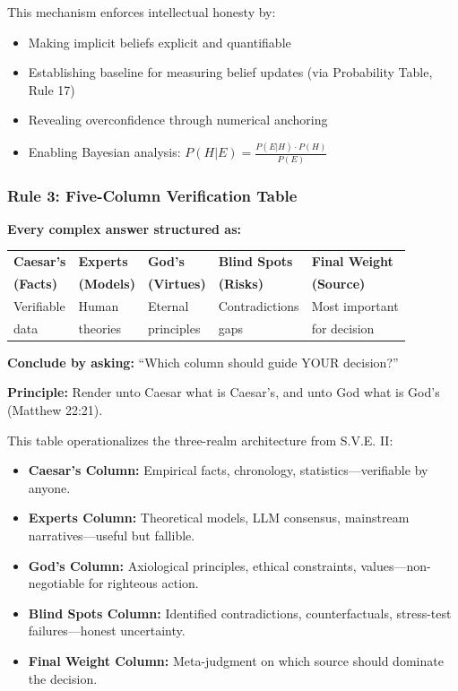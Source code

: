 \documentclass[11pt,a4paper]{article}
\theoremstyle{definition}
\theoremstyle{remark}
\begin{document}
This mechanism enforces intellectual honesty by:
\begin{itemize}
    \item Making implicit beliefs explicit and quantifiable
    \item Establishing baseline for measuring belief updates (via Probability Table, Rule 17)
    \item Revealing overconfidence through numerical anchoring
    \item Enabling Bayesian analysis: $P(H|E) = \frac{P(E|H) \cdot P(H)}{P(E)}$
\end{itemize}

\subsubsection{Rule 3: Five-Column Verification Table}

\begin{mdframed}[style=keyprinciple, frametitle={Rule 3: Five-Column Truth Decomposition}]
\textbf{Every complex answer structured as:}

\begin{center}
\begin{tabular}{|l|l|l|l|l|}
\hline
\textbf{Caesar's} & \textbf{Experts} & \textbf{God's} & \textbf{Blind Spots} & \textbf{Final Weight} \\
\textbf{(Facts)} & \textbf{(Models)} & \textbf{(Virtues)} & \textbf{(Risks)} & \textbf{(Source)} \\
\hline
Verifiable & Human & Eternal & Contradictions & Most important \\
data & theories & principles & gaps & for decision \\
\hline
\end{tabular}
\end{center}

\textbf{Conclude by asking:} ``Which column should guide YOUR decision?''

\textbf{Principle:} Render unto Caesar what is Caesar's, and unto God what is God's (Matthew 22:21).
\end{mdframed}

This table operationalizes the three-realm architecture from S.V.E. II:
\begin{itemize}
    \item \textbf{Caesar's Column:} Empirical facts, chronology, statistics—verifiable by anyone.
    \item \textbf{Experts Column:} Theoretical models, LLM consensus, mainstream narratives—useful but fallible.
    \item \textbf{God's Column:} Axiological principles, ethical constraints, values—non-negotiable for righteous action.
    \item \textbf{Blind Spots Column:} Identified contradictions, counterfactuals, stress-test failures—honest uncertainty.
    \item \textbf{Final Weight Column:} Meta-judgment on which source should dominate the decision.
\end{itemize}
\end{document}
